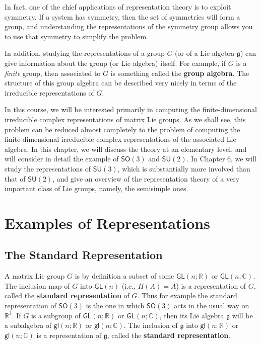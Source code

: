 \documentclass{amsbook}
\let \frak = \mathfrak
\theoremstyle{plain}
\numberwithin{equation}{chapter}
\numberwithin{theorem}{chapter}
\begin{document}
In fact, one of the chief applications of representation theory is to exploit
symmetry. If a system has symmetry, then the set of symmetries will form a
group, and understanding the representations of the symmetry group allows you
to use that symmetry to simplify the problem.

In addition, studying the representations of a group $G$ (or of a Lie algebra
$\frak{g}$) can give information about the group (or Lie algebra) itself. For
example, if $G$ is a \textit{finite} group, then associated to $G $ is
something called the \textbf{group algebra}. The structure of this group
algebra can be described very nicely in terms of the irreducible
representations of $G$.

In this course, we will be interested primarily in computing the
finite-dimensional irreducible complex representations of matrix Lie groups.
As we shall see, this problem can be reduced almost completely to the problem
of computing the finite-dimensional irreducible complex representations of the
associated Lie algebra. In this chapter, we will discuss the theory at an
elementary level, and will consider in detail the example of $\mathsf{SO}(3)$
and $\mathsf{SU}(2)$. In Chapter 6, we will study the representations of
$\mathsf{SU}(3)$, which is substantially more involved than that of
$\mathsf{SU}(2)$, and give an overview of the representation theory of a very
important class of Lie groups, namely, the semisimple ones.

\section{Examples of Representations\label{examples.rep}}

\subsection{The Standard Representation}

A matrix Lie group $G$ is by definition a subset of some $\mathsf{GL}%
(n;\mathbb{R})$ or $\mathsf{GL}(n;\mathbb{C})$. The inclusion map of $G$ into
$\mathsf{GL}(n)$ (i.e., $\Pi(A)=A$) is a representation of $G$, called the
\textbf{standard representation} of $G$. Thus for example the standard
representation of $\mathsf{SO}(3)$ is the one in which $\mathsf{SO}(3)$ acts
in the usual way on $\mathbb{R}^{3}$. If $G$ is a subgroup of $\mathsf{GL}%
(n;\mathbb{R})$ or $\mathsf{GL}(n;\mathbb{C})$, then its Lie algebra
$\frak{g}$ will be a subalgebra of $\mathsf{gl}(n;\mathbb{R})$ or
$\mathsf{gl}(n;\mathbb{C})$. The inclusion of $\frak{g}$ into $\mathsf{gl}%
(n;\mathbb{R})$ or $\mathsf{gl}(n;\mathbb{C})$ is a representation of
$\frak{g}$, called the \textbf{standard representation}.
\end{document}
